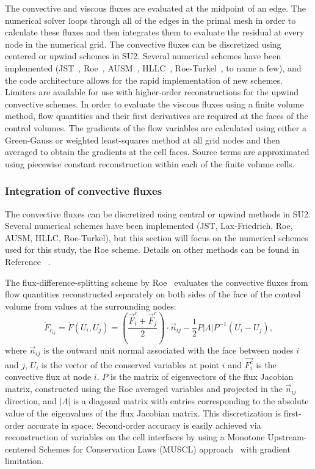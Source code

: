 The convective and viscous fluxes are evaluated at the midpoint of an edge. The numerical solver loops through all of the edges in the primal mesh in order to calculate these fluxes and then integrates them to evaluate the residual at every node in the numerical grid. The convective fluxes can be discretized using centered or upwind schemes in SU2. Several numerical schemes have been implemented (JST~\cite{jameson1981}, Roe~\cite{roe1981}, AUSM~\cite{liou93}, HLLC~\cite{toro1999}, Roe-Turkel~\cite{turkel_1}, to name a few), and the code architecture allows for the rapid implementation of new schemes. Limiters are available for use with higher-order reconstructions for the upwind convective schemes. In order to evaluate the viscous fluxes using a finite volume method, flow quantities and their first derivatives are required at the faces of the control volumes. The gradients of the flow variables are calculated using either a Green-Gauss or weighted least-squares method at all grid nodes and then averaged to obtain the gradients at the cell faces. Source terms are approximated using piecewise constant reconstruction within each of the finite volume cells.

\subsubsection*{Integration of convective fluxes}

The convective fluxes can be discretized using central or upwind methods in SU2. Several numerical schemes have been implemented (JST, Lax-Friedrich, Roe, AUSM, HLLC, Roe-Turkel), but this section will focus on the numerical schemes used for this study, the Roe scheme. Details on other methods can be found in Reference ~.

The flux-difference-splitting scheme by Roe~\cite{roe1981} evaluates the convective fluxes from flow quantities reconstructed separately on both sides of the face of the control volume from values at the surrounding nodes:
\begin{equation} \label{eq:roe}
\tilde{F}_{c_{ij}} = \tilde{F}(U_i, U_j) = \left(\frac{\vec{F}^c_i +\vec{F}^c_j}{2}\right)\cdot \vec{n}_{ij} - \frac{1}{2} P|\Lambda|P^{-1}(U_i - U_j), 
\end{equation}
where $\vec{n}_{ij}$ is the outward unit normal associated with the face between nodes $i$ and $j$, $U_i$ is the vector of the conserved variables at point $i$ and $\vec{F^c_i}$ is the convective flux at node $i$. $P$ is the matrix of eigenvectors of the flux Jacobian matrix, constructed using the Roe averaged variables and projected in the $\vec{n}_{ij}$ direction, and $|\Lambda|$ is a diagonal matrix with entries corresponding to the absolute value of the eigenvalues of the flux Jacobian matrix. This discretization is first-order accurate in space. Second-order accuracy is easily achieved via reconstruction of variables on the cell interfaces by using a Monotone Upstream-centered Schemes for Conservation Laws (MUSCL) approach~\cite{Leer1979} with gradient limitation.


